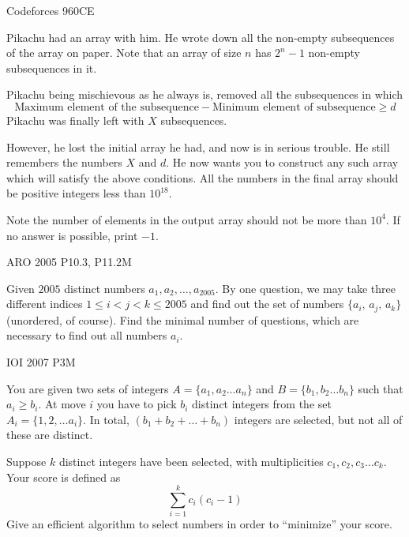 


{Codeforces 960C}{E}{
    Pikachu had an array with him. He wrote down all the non-empty
    subsequences of the array on paper. Note that an array of size $n$ has 
    $2^n - 1$ non-empty subsequences in it.

    Pikachu being mischievous as he always is, removed all the subsequences in
    which \[ \text{Maximum element of the subsequence} - \text{Minimum element
    of subsequence} \geq d \]
    Pikachu was finally left with $X$ subsequences.

    However, he lost the initial array he had, and now is in serious trouble.
    He still remembers the numbers $X$ and $d$. He now wants you to
    construct any such array which will satisfy the above conditions. All the
    numbers in the final array should be positive integers less than $10^{18}$.

    Note the number of elements in the output array should not be more than
    $10^4$. If no answer is possible, print $-1$.
}\label{problem:constructive_algo_3}


{ARO 2005 P10.3, P11.2}{M}{
    Given $2005$ distinct numbers $a_1,a_2,\dots,a_{2005}$. By one question,
    we may take three different indices $1\le i<j<k\le 2005$ and find out the
    set of numbers $\{a_i,\,a_j,\,a_k\}$ (unordered, of course). Find the
    minimal number of questions, which are necessary to find out all numbers
    $a_i$.

}\label{problem:constructive_algo_4}




{IOI 2007 P3}{M}{
    You are given two sets of integers $ A=\{a_1, a_2 \dots a_n\} $ and $
    B=\{b_1, b_2 \dots b_n\} $ such that $ a_i \geq b_i $.  At move $ i $ you
    have to pick $ b_i $ distinct integers from the set $ A_i = \{1, 2, \dots
    a_i\} $. In total, $ (b_1 + b_2 +\dots + b_n) $ integers are selected, but
    not all of these are distinct.

    Suppose $ k $ distinct integers have been selected, with multiplicities $
    c_1, c_2, c_3 \dots c_k $. Your score is defined as
    \[\sum^k_{i=1}c_i(c_i-1)\] 
    Give an efficient algorithm to select numbers in order to ``minimize''
    your score.

}\label{problem:constructive_algo_5}\label{problem:swapping_2}

